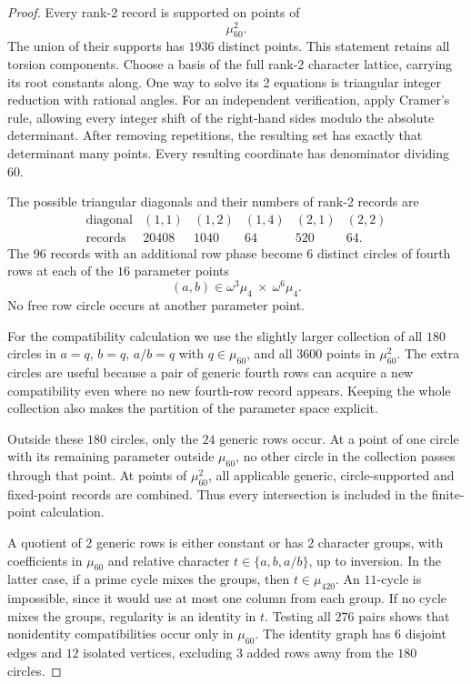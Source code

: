 \documentclass[11pt,a4paper]{article}
\theoremstyle{plain}
\theoremstyle{definition}
\theoremstyle{plain}
\begin{document}
\begin{proof}
Every rank-2 record is supported on points of
\[
\mu_{60}^2.
\]
The union of their supports has $1936$ distinct points. This statement retains all torsion components. Choose a basis of the full rank-2 character lattice, carrying its root constants along. One way to solve its 2 equations is triangular integer reduction with rational angles. For an independent verification, apply Cramer's rule, allowing every integer shift of the right-hand sides modulo the absolute determinant. After removing repetitions, the resulting set has exactly that determinant many points. Every resulting coordinate has denominator dividing $60$.

The possible triangular diagonals and their numbers of rank-2 records are
$$\begin{array}{c|rrrrr}
\text{diagonal}&(1,1)&(1,2)&(1,4)&(2,1)&(2,2)\\\hline
\text{records}&20408&1040&64&520&64.
\end{array}$$
The $96$ records with an additional row phase become 6 distinct circles of fourth rows at each of the $16$ parameter points
\[
(a,b)\in\omega^{3}\mu_4\ \times\ \omega^{6}\mu_4.
\]
No free row circle occurs at another parameter point.

For the compatibility calculation we use the slightly larger collection of all $180$ circles in $a=q$, $b=q$, $a/b=q$ with $q\in\mu_{60}$, and all $3600$ points in $\mu_{60}^2$. The extra circles are useful because a pair of generic fourth rows can acquire a new compatibility even where no new fourth-row record appears. Keeping the whole collection also makes the partition of the parameter space explicit.

Outside these $180$ circles, only the $24$ generic rows occur. At a point of one circle with its remaining parameter outside $\mu_{60}$, no other circle in the collection passes through that point. At points of $\mu_{60}^2$, all applicable generic, circle-supported and fixed-point records are combined. Thus every intersection is included in the finite-point calculation.

\medskip
A quotient of 2 generic rows is either constant or has 2 character groups, with coefficients in $\mu_{60}$ and relative character $t\in\{a,b,a/b\}$, up to inversion. In the latter case, if a prime cycle mixes the groups, then $t\in\mu_{420}$. An $11$-cycle is impossible, since it would use at most one column from each group. If no cycle mixes the groups, regularity is an identity in $t$. Testing all $276$ pairs shows that nonidentity compatibilities occur only in $\mu_{60}$. The identity graph has $6$ disjoint edges and $12$ isolated vertices, excluding $3$ added rows away from the $180$ circles.


\end{proof}
\end{document}
